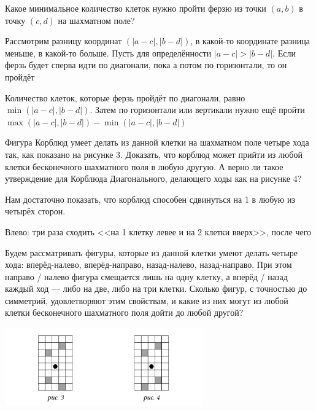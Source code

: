 \begin{itemize}
\itA Какое минимальное количество клеток нужно пройти ферзю из точки $(a,b)$ в точку $(c,d)$ на шахматном поле?

Рассмотрим разницу координат $(|a-c|,|b-d|)$, в какой-то координате разница меньше, в какой-то больше.
Пусть для определённости $|a-c| > |b-d|$.
Если ферзь будет сперва идти по диагонали, пока а потом по горизонтали, то он пройдёт 



Количество клеток, которые ферзь пройдёт по диагонали, равно $\min(|a-c|,|b-d|)$. 
Затем по горизонтали или вертикали нужно ещё пройти $\max(|a-c|,|b-d|) - \min(|a-c|,|b-d|)$

\itB Фигура Корблюд умеет делать из данной клетки на шахматном поле четыре хода так, как показано на 
рисунке 3. Доказать, что корблюд может прийти из любой клетки бесконечного шахматного поля в любую 
другую. А верно ли такое утверждение для Корблюда Диагонального, делающего ходы как на рисунке 4?

Нам достаточно показать, что корблюд способен сдвинуться на 1 в любую из четырёх сторон.

Влево: три раза сходить <<на 1 клетку левее и на 2 клетки вверх>>, после чего 

\itC Будем рассматривать фигуры, которые из данной клетки умеют делать четыре хода: 
вперёд-налево, вперёд-направо, назад-налево, назад-направо. При этом направо / налево фигура 
смещается лишь на одну клетку, а вперёд / назад каждый ход — либо на две, либо на три клетки. 
Сколько фигур, с точностью до симметрий, удовлетворяют этим свойствам, и какие из них могут 
из любой клетки бесконечного шахматного поля дойти до любой другой?
\end{itemize}

\begin{center}
  \includegraphics[width=8.5cm]{figures/2016/corbleud.png}
\end{center}
